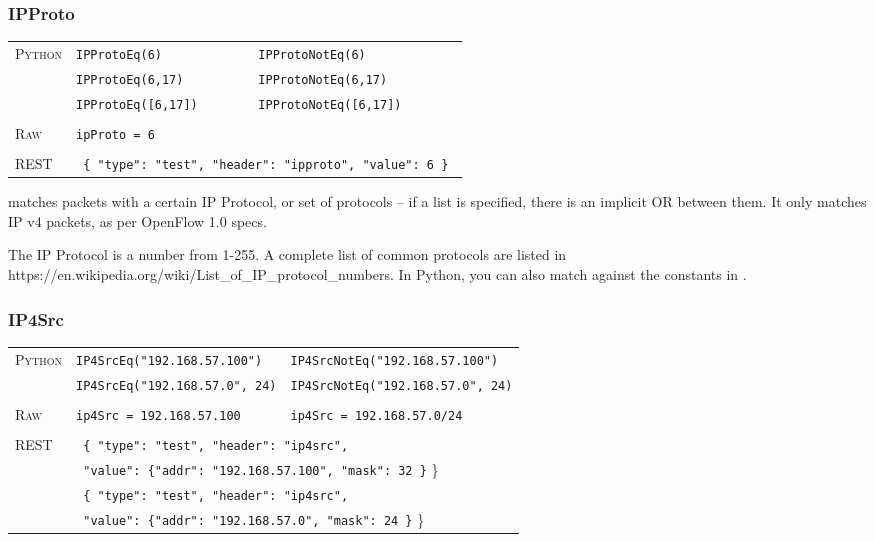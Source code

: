 \subsubsection{IPProto}

\bigskip
\begin{tabularx}{\linewidth}{lXX}
\textsc{Python}   & \texttt{IPProtoEq(6)}    & \texttt{IPProtoNotEq(6)} \\
    & \texttt{IPProtoEq(6,17)}  & \texttt{IPProtoNotEq(6,17)} \\
    & \texttt{IPProtoEq([6,17])}  & \texttt{IPProtoNotEq([6,17])} \\ \\
\textsc{Raw}    & \texttt{ipProto = 6}     & \\ \\
\textsc{REST} & \multicolumn{2}{l}{\texttt{ \{ "type": "test", "header": "ipproto", "value": 6 \} }} 
\end{tabularx}

 matches packets with a certain IP Protocol, or set of protocols -- if a list is specified, 
there is an implicit OR between them.  It only matches IP v4 packets, as per OpenFlow 1.0 specs.  

The IP Protocol is a number from 1-255.  A complete list of common protocols are listed in 
https://en.wikipedia.org/wiki/List\_of\_IP\_protocol\_numbers.  In Python, you can also match against the
constants in .

\subsubsection{IP4Src}

\bigskip
\begin{tabularx}{\linewidth}{lXX}
\textsc{Python}   & \texttt{IP4SrcEq("192.168.57.100")}    & \texttt{IP4SrcNotEq("192.168.57.100")} \\
    & \texttt{IP4SrcEq("192.168.57.0", 24)}  & \texttt{IP4SrcNotEq("192.168.57.0", 24)} \\ \\
\textsc{Raw}    & \texttt{ip4Src = 192.168.57.100}     & \texttt{ip4Src = 192.168.57.0/24} \\ \\
\textsc{REST} & \multicolumn{2}{l}{\texttt{ \{ "type": "test", "header": "ip4src",}} \\
   & \multicolumn{2}{l}{\texttt{  "value": \{"addr": "192.168.57.100", "mask": 32 \}} \}} \\
   & \multicolumn{2}{l}{\texttt{ \{ "type": "test", "header": "ip4src",}} \\
   & \multicolumn{2}{l}{\texttt{  "value": \{"addr": "192.168.57.0", "mask": 24 \}} \}} \\
\end{tabularx}

